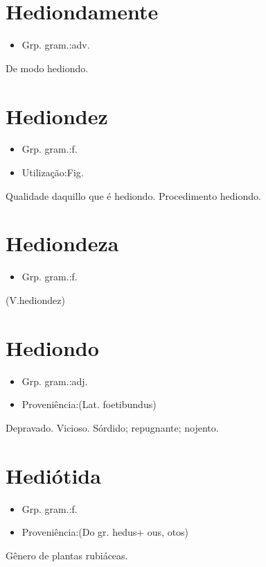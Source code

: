 \documentclass{article}
\begin{document}
\section{Hediondamente}
\begin{itemize}
\item {Grp. gram.:adv.}
\end{itemize}
De modo hediondo.
\section{Hediondez}
\begin{itemize}
\item {Grp. gram.:f.}
\end{itemize}
\begin{itemize}
\item {Utilização:Fig.}
\end{itemize}
Qualidade daquillo que é hediondo.
Procedimento hediondo.
\section{Hediondeza}
\begin{itemize}
\item {Grp. gram.:f.}
\end{itemize}
(V.hediondez)
\section{Hediondo}
\begin{itemize}
\item {Grp. gram.:adj.}
\end{itemize}
\begin{itemize}
\item {Proveniência:(Lat. \textunderscore foetibundus\textunderscore )}
\end{itemize}
Depravado.
Vicioso.
Sórdido; repugnante; nojento.
\section{Hediótida}
\begin{itemize}
\item {Grp. gram.:f.}
\end{itemize}
\begin{itemize}
\item {Proveniência:(Do gr. \textunderscore hedus\textunderscore  + \textunderscore ous\textunderscore , \textunderscore otos\textunderscore )}
\end{itemize}
Gênero de plantas rubiáceas.
\end{document}
